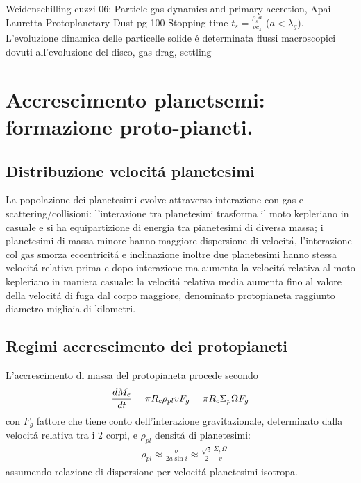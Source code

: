 \begin{workout}
Weidenschilling cuzzi 06: Particle-gas dynamics and primary accretion, Apai Lauretta Protoplanetary Dust pg 100
Stopping time $t_s=\frac{\rho_sa}{\rho c_s}$ ($a<\lambda_g$). L'evoluzione dinamica delle particelle solide \'e determinata flussi macroscopici dovuti all'evoluzione del disco, gas-drag, settling
\end{workout}

\section{Accrescimento planetsemi: formazione proto-pianeti.}


\subsection{Distribuzione velocit\'a planetesimi}

La popolazione dei planetesimi evolve attraverso interazione con gas e scattering/collisioni: l'interazione tra planetesimi trasforma il moto kepleriano in casuale e si ha equipartizione di energia tra pianetesimi di diversa massa; i planetesimi di massa minore hanno maggiore dispersione di velocit\'a, l'interazione col gas smorza eccentricit\'a e inclinazione inoltre due planetesimi hanno stessa velocit\'a relativa prima e dopo interazione ma aumenta la velocit\'a relativa al moto kepleriano in maniera casuale: la velocit\'a relativa media aumenta fino al valore della velocit\'a di fuga dal corpo maggiore, denominato protopianeta raggiunto diametro migliaia di kilometri.


\subsection{Regimi accrescimento dei protopianeti}

L'accrescimento di massa del protopianeta procede secondo
\begin{equation}
\TDy{t}{M_e}=\pi R_c\rho_{pl}v F_g=\pi R_c\Sigma_p\Omega F_g
\end{equation}
con $F_g$ fattore che tiene conto dell'interazione gravitazionale, determinato dalla velocit\'a relativa tra i 2 corpi, e $\rho_{pl}$ densit\'a di planetesimi:
\begin{align}
&\rho_{pl}\approx\frac{\sigma}{2a\sin{i}}\approx\frac{\sqrt{3}}{2}\frac{\Sigma_p\Omega}{v}
\end{align}
assumendo relazione di dispersione per velocit\'a planetesimi isotropa.

